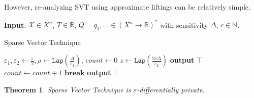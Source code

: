 \documentclass[12pt]{article}
\newcommand{\NN}{\mathbb{N}}
\newcommand{\RR}{\mathbb{R}}
\newcommand{\Lap}{\texttt{Lap}}
\newtheorem{thm}{Theorem}[section]
\theoremstyle{definition}
\begin{document}
However, re-analyzing SVT using approximate liftings can be relatively simple. 

\begin{algorithm}
    \hspace*{\algorithmicindent}\textbf{Input}: $\mathcal{X}\in X^n$, $T\in \RR$, $Q=q_1, \ldots \in {(X^n\to \RR)}^*$ with sensitivity $\Delta$, $c\in \NN$.
    \begin{algorithmic}[1]
        \caption{Sparse Vector Technique}\label{couplingAlg}
        \State $\varepsilon_1, \varepsilon_2 \gets \frac{\varepsilon}{2},
        \rho \gets \Lap(\frac{\Delta}{\varepsilon_1})$, $count \gets 0$
			\State $z\gets \Lap(\frac{2c\Delta}{\varepsilon_2})$
                \State\textbf{output} $\top$
                \State$count\gets count+1$
                    \State$\textbf{break}$
                \EndIf
            \Else
                \State\textbf{output} $\bot$
            \EndIf
		\EndFor
    \end{algorithmic}
\end{algorithm}


\begin{thm}
    Sparse Vector Technique is $\varepsilon$-differentially private. 
\end{thm}
\end{document}
